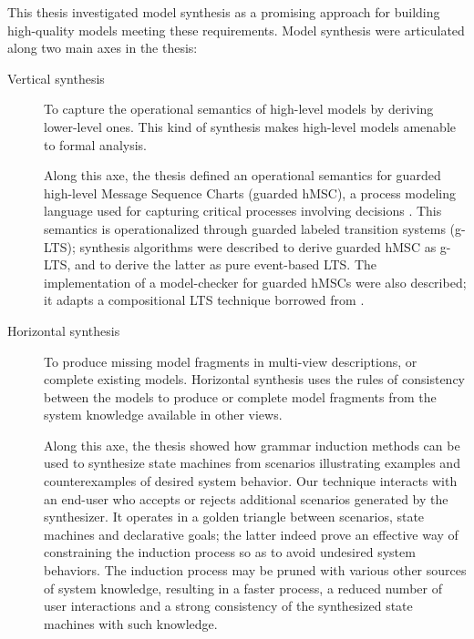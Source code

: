 This thesis investigated model synthesis as a promising approach for building high-quality models meeting these requirements. Model synthesis were articulated along two main axes in the thesis:
\begin{description}
\item[Vertical synthesis] To capture the operational semantics of high-level models by deriving lower-level ones. This kind of synthesis makes high-level models amenable to formal analysis.

Along this axe, the thesis defined an operational semantics for guarded high-level Message Sequence Charts (guarded hMSC), a process modeling language used for capturing critical processes involving decisions \cite{Damas:2011}. This semantics is operationalized through guarded labeled transition systems (g-LTS); synthesis algorithms were described to derive guarded hMSC as g-LTS, and to derive the latter as pure event-based LTS. The implementation of a model-checker for guarded hMSCs were also described; it adapts a compositional LTS technique borrowed from \cite{Giannakopoulou:2003}.

\item[Horizontal synthesis] To produce missing model fragments in multi-view descriptions, or complete existing models. Horizontal synthesis uses the rules of consistency between the models to produce or complete model fragments from the  system knowledge available in other views.

Along this axe, the thesis showed how grammar induction methods can be used to synthesize state machines from scenarios illustrating examples and counterexamples of desired system behavior. Our technique interacts with an end-user who accepts or rejects additional scenarios generated by the synthesizer. It operates in a golden triangle between scenarios, state machines and declarative goals; the latter indeed prove an effective way of constraining the induction process so as to avoid undesired system behaviors. The induction process may be pruned with various other sources of system knowledge, resulting in a faster process, a reduced number of user interactions and a strong consistency of the synthesized state machines with such knowledge.
\end{description}

